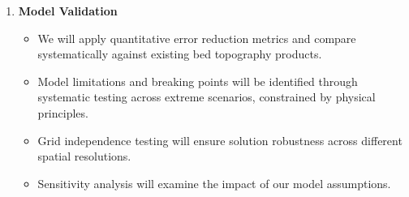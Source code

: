\begin{enumerate}
\item\textbf{Model Validation}
    \begin{itemize}
    \item We will apply quantitative error reduction metrics and compare systematically against existing bed topography products.
    
    \item Model limitations and breaking points will be identified through systematic testing across extreme scenarios, constrained by physical principles.
    
    \item Grid independence testing will ensure solution robustness across different spatial resolutions.
    
    \item Sensitivity analysis will examine the impact of our model assumptions.
    \end{itemize}
\end{enumerate}




